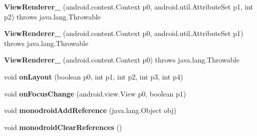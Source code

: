 \begin{DoxyCompactItemize}
\item 
\mbox{\label{classmd5b60ffeb829f638581ab2bb9b1a7f4f3f_1_1_view_renderer__2_aa98f61b833d11b90b0f77280606f4d3a}} 
{\bfseries View\+Renderer\+\_} (android.\+content.\+Context p0, android.\+util.\+Attribute\+Set p1, int p2)  throws java.\+lang.\+Throwable 	
\item 
\mbox{\label{classmd5b60ffeb829f638581ab2bb9b1a7f4f3f_1_1_view_renderer__2_ac966f9a1a233932f6db02bda0d1474f0}} 
{\bfseries View\+Renderer\+\_} (android.\+content.\+Context p0, android.\+util.\+Attribute\+Set p1)  throws java.\+lang.\+Throwable 	
\item 
\mbox{\label{classmd5b60ffeb829f638581ab2bb9b1a7f4f3f_1_1_view_renderer__2_aafcf92f11bfe726fa3c914d9aa18b1a4}} 
{\bfseries View\+Renderer\+\_} (android.\+content.\+Context p0)  throws java.\+lang.\+Throwable 	
\item 
\mbox{\label{classmd5b60ffeb829f638581ab2bb9b1a7f4f3f_1_1_view_renderer__2_a0b758be41e41d3577cadf82bc8d004b6}} 
void {\bfseries on\+Layout} (boolean p0, int p1, int p2, int p3, int p4)
\item 
\mbox{\label{classmd5b60ffeb829f638581ab2bb9b1a7f4f3f_1_1_view_renderer__2_a44502ddde192de41caed438bc7428e96}} 
void {\bfseries on\+Focus\+Change} (android.\+view.\+View p0, boolean p1)
\item 
\mbox{\label{classmd5b60ffeb829f638581ab2bb9b1a7f4f3f_1_1_view_renderer__2_a64ca8244a89f60a47c173d9c0b15d610}} 
void {\bfseries monodroid\+Add\+Reference} (java.\+lang.\+Object obj)
\item 
\mbox{\label{classmd5b60ffeb829f638581ab2bb9b1a7f4f3f_1_1_view_renderer__2_adae20979ac761a65aa60c9b427509c37}} 
void {\bfseries monodroid\+Clear\+References} ()
\end{DoxyCompactItemize}

